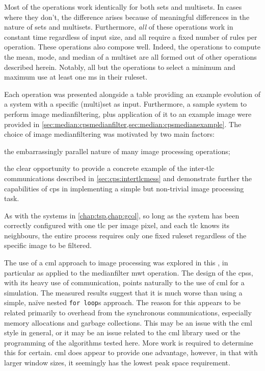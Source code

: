 Most of the operations work identically for both sets and multisets.  In cases where they don't, the difference arises because of meaningful differences in the nature of sets and multisets.  Furthermore, \emph{all} of these operations work in constant time regardless of input size, and all require a fixed number of rules per operation.  These operations also compose well.  Indeed, the operations to compute the mean, mode, and median of a multiset are all formed out of other operations described herein.  Notably, all but the operations to select a minimum and maximum use at least one \gls{ms} in their ruleset.

Each operation was presented alongside a table providing an example evolution of a system with a specific (multi)set as input.  Furthermore, a sample system to perform image \gls{medianfilter}ing, plus application of it to an example image were provided in \cref{sec:median:cpsmedianfilter,sec:median:cpsmedianexample}.  The choice of image \gls{medianfilter}ing was motivated by two main factors:
\begin{inparaenum}[(i)]
\item the embarrassingly parallel nature of many image processing operations;
\item the clear opportunity to provide a concrete example of the inter-\gls{tlc} communications described in \cref{sec:cps:intertlcmess} and demonstrate further the capabilities of \gls{cps} in implementing a simple but non-trivial image processing task.
\end{inparaenum}
As with the systems in \cref{chap:tsp,chap:gcol}, so long as the system has been correctly configured with one \gls{tlc} per image pixel, and each \gls{tlc} knows its neighbours, the entire process requires only one fixed ruleset regardless of the specific image to be filtered.

The use of a \gls{cml} approach to image processing was explored in this , in particular as applied to the \gls{medianfilter} \gls{mwt} operation.  The design of the \glspl{cps}, with its heavy use of communication, points naturally to the use of \gls{cml} for a simulation.  The measured results suggest that it is much worse than using a simple, naïve nested \texttt{for loop}s approach.  The reason for this appears to be related primarily to overhead from the synchronous communications, especially memory allocations and garbage collections.  This may be an issue with the \gls{cml} style in general, or it may be an issue related to the \gls{cml} library used or the programming of the algorithms tested here.  More work is required to determine this for certain.  \Gls{cml} does appear to provide one advantage, however, in that with larger window sizes, it seemingly has the lowest peak space requirement.

